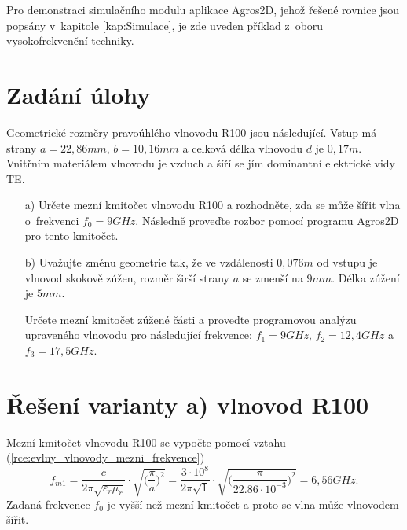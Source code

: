 
Pro demonstraci simulačního modulu aplikace Agros2D, jehož řešené rovnice jsou popsány v~kapitole \ref{kap:Simulace}, je zde uveden příklad z~oboru vysokofrekvenční techniky. 

\section{Zadání úlohy}
Geometrické rozměry pravoúhlého vlnovodu R100 \cite{R100} jsou následující. Vstup má strany $a = 22,86 \unit{mm}$, $b = 10,16 \unit{mm}$ a celková délka vlnovodu $d$ je $0,17 \unit{m}$. Vnitřním materiálem vlnovodu je vzduch a šíří se jím dominantní elektrické vidy TE. 
\begin{enumerate}
\item[a)] Určete mezní kmitočet vlnovodu R100 a rozhodněte, zda se může šířit vlna o~frekvenci $f_0 = 9 \unit{GHz}$. Následně proveďte rozbor pomocí programu Agros2D pro tento kmitočet. 
\item[b)] Uvažujte změnu geometrie tak, že ve vzdálenosti $0,076 \unit{m}$ od vstupu je vlnovod skokově zúžen, rozměr širší strany $a$ se zmenší na $9 \unit {mm}$. Délka zúžení je $5 \unit{mm}$. 

Určete mezní kmitočet zúžené části a proveďte programovou analýzu upraveného vlnovodu pro následující frekvence:  $f_1 = 9 \unit{GHz}$, $f_2 = 12,4 \unit{GHz}$ a $f_3 = 17,5 \unit{GHz}$.
\end{enumerate}

\section{Řešení varianty a) vlnovod R100}
Mezní kmitočet vlnovodu R100 se vypočte pomocí vztahu (\ref{rce:evlny_vlnovody_mezni_frekvence})
\begin{displaymath}
f_{m1} = \frac{c}{2\pi\sqrt{\varepsilon_{r}\mu_{r}}}\cdot\sqrt{\bigg(\frac{\pi}{a}\bigg)^{2}} = \frac{3\cdot 10^{8}}{2\pi\sqrt{1}}\cdot\sqrt{\bigg(\frac{\pi}{22.86\cdot 10^{-3}}\bigg)^{2}} = 6,56 \unit{GHz}.
\end{displaymath}
Zadaná frekvence $f_0$ je vyšší než mezní kmitočet a proto se vlna může vlnovodem šířit.


